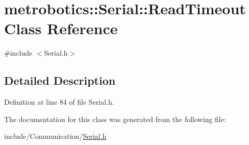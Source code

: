 \hypertarget{classmetrobotics_1_1Serial_1_1ReadTimeout}{\section{metrobotics\-:\-:\-Serial\-:\-:\-Read\-Timeout \-Class \-Reference}
\label{classmetrobotics_1_1Serial_1_1ReadTimeout}
}


{\ttfamily \#include $<$\-Serial.\-h$>$}



\subsection{\-Detailed \-Description}


\-Definition at line 84 of file \-Serial.\-h.



\-The documentation for this class was generated from the following file\-:\begin{DoxyCompactItemize}
\item 
include/\-Communication/\hyperlink{Serial_8h}{\-Serial.\-h}\end{DoxyCompactItemize}
